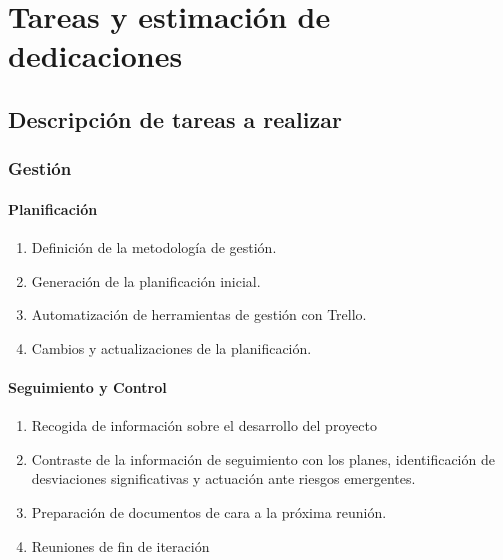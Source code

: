 \section{Tareas y estimación de dedicaciones}\label{sec:tareas}





\subsection{Descripción de tareas a realizar}\label{subsec:tareas-descripcion}

\subsubsection{Gestión}
\paragraph{Planificación}
\begin{enumerate}
    \item Definición de la metodología de gestión.
    \item Generación de la planificación inicial.
    \item Automatización de herramientas de gestión con Trello.
    \item Cambios y actualizaciones de la planificación.
\end{enumerate}
\paragraph{Seguimiento y Control}
\begin{enumerate}
    \item Recogida de información sobre el desarrollo del proyecto
    \item Contraste de la información de seguimiento con los planes, identificación de desviaciones significativas y actuación ante riesgos emergentes.
    \item Preparación de documentos de cara a la próxima reunión.
    \item Reuniones de fin de iteración
\end{enumerate}

